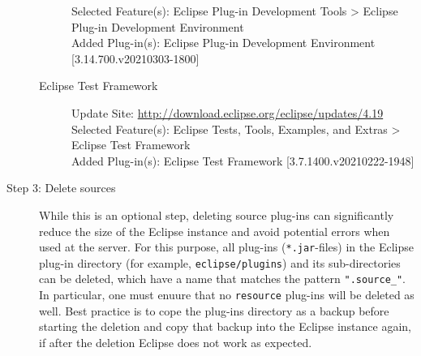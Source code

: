 \begin{description}
\begin{description}
			Selected Feature(s): Eclipse Plug-in Development Tools > Eclipse Plug-in Development Environment \\
			Added Plug-in(s): Eclipse Plug-in Development Environment [3.14.700.v20210303-1800]
			\item[Eclipse Test Framework] $ $\\
			Update Site: \url{http://download.eclipse.org/eclipse/updates/4.19} \\
			Selected Feature(s): Eclipse Tests, Tools, Examples, and Extras > Eclipse Test Framework \\
			Added Plug-in(s): Eclipse Test Framework [3.7.1400.v20210222-1948]
		\end{description}
	\item[Step 3: Delete sources] $ $\\
		While this is an optional step, deleting source plug-ins can significantly reduce the size of the Eclipse instance and avoid potential errors when used at the server. For this purpose, all plug-ins (\texttt{*.jar}-files) in the Eclipse plug-in directory (for example, \texttt{eclipse/plugins}) and its sub-directories can be deleted, which have a name that matches the pattern \texttt{".source\_"}. In particular, one must enuure that no \texttt{resource} plug-ins will be deleted as well. Best practice is to cope the plug-ins directory as a backup before starting the deletion and copy that backup into the Eclipse instance again, if after the deletion Eclipse does not work as expected.
\end{description}

